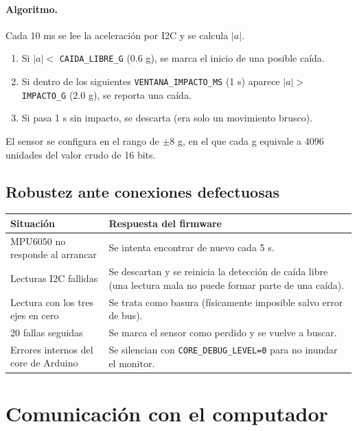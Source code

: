\documentclass[11pt,a4paper]{article}
\begin{document}
\paragraph{Algoritmo.} Cada 10 ms se lee la aceleración por I2C y se calcula $|a|$.
\begin{enumerate}[leftmargin=*]
  \item Si $|a| <$ \texttt{CAIDA\_LIBRE\_G} (0.6 g), se marca el inicio de una posible caída.
  \item Si dentro de los siguientes \texttt{VENTANA\_IMPACTO\_MS} (1 s) aparece
        $|a| >$ \texttt{IMPACTO\_G} (2.0 g), se reporta una caída.
  \item Si pasa 1 s sin impacto, se descarta (era solo un movimiento brusco).
\end{enumerate}

El sensor se configura en el rango de $\pm 8$ g, en el que cada g equivale a 4096
unidades del valor crudo de 16 bits.

\subsection{Robustez ante conexiones defectuosas}\label{sec:robustez}

\begin{center}
\begin{tabular}{@{}p{4.6cm} p{11cm}@{}}
\toprule
\textbf{Situación} & \textbf{Respuesta del firmware}\\
\midrule
MPU6050 no responde al arrancar & Se intenta encontrar de nuevo cada 5 s.\\
Lecturas I2C fallidas & Se descartan y se reinicia la detección de caída libre (una lectura mala no puede formar parte de una caída).\\
Lectura con los tres ejes en cero & Se trata como basura (físicamente imposible salvo error de bus).\\
20 fallas seguidas & Se marca el sensor como perdido y se vuelve a buscar.\\
Errores internos del core de Arduino & Se silencian con \texttt{CORE\_DEBUG\_LEVEL=0} para no inundar el monitor.\\
\bottomrule
\end{tabular}
\end{center}

\section{Comunicación con el computador}
\end{document}
